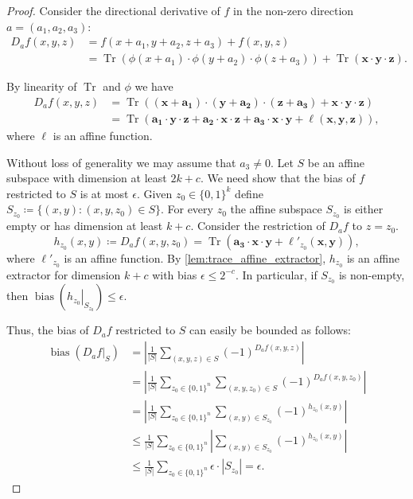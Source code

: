 \documentclass[a4paper,11pt,draft]{article}
\theoremstyle{definition}
\theoremstyle{remark}
\DeclareMathOperator{\Tr}{Tr}
\DeclareMathOperator{\bias}{bias}
\newcommand{\card}[1]{{\left|#1\right|}}
\newcommand{\iso}[1]{\mathbf{#1}}
\newcommand{\Q}{{\{0,1\}}}
\newcommand{\restr}[2]{\left.#1\right|_{#2}}
\begin{document}
\begin{proof}
  Consider the directional derivative of $f$ in the non-zero direction $a = (a_1,a_2,a_3)$:
  \begin{align*}
    D_{a} f(x, y, z) &=
    f(x+a_1, y+a_2, z+a_3) + f(x, y, z) \\ &=
    \Tr(\phi(x+a_1) \cdot \phi(y+a_2) \cdot \phi(z+a_3)) + \Tr(\iso{x} \cdot \iso{y} \cdot \iso{z}).
  \end{align*}

  By linearity of $\Tr$ and $\phi$ we have
  \begin{align*}
    D_{a} f(x, y, z) &=
    \Tr((\iso{x}+\iso{a_1}) \cdot (\iso{y} + \iso{a_2}) \cdot (\iso{z} + \iso{a_3}) + \iso{x} \cdot \iso{y} \cdot \iso{z}) \\ &=
    \Tr(\iso{a_1} \cdot \iso{y} \cdot \iso{z} + \iso{a_2} \cdot \iso{x} \cdot \iso{z} + \iso{a_3} \cdot \iso{x} \cdot \iso{y} + \ell(\iso{x},\iso{y},\iso{z})),
  \end{align*}
  where $\ell$ is an affine function.

  Without loss of generality we may assume that $a_3 \neq 0$.
  Let $S$ be an affine subspace with dimension at least $2k+c$. We need show that the bias of $f$ restricted to $S$ is at most $\epsilon$. Given $z_0 \in \Q^k$ define $S_{z_0} \coloneqq \{(x, y) : (x, y, z_0) \in S\}$. For every $z_0$ the affine subspace $S_{z_0}$ is either empty or has dimension at least $k+c$.
  Consider the restriction of $D_a f$ to $z = z_0$.
  \[
    h_{z_0}(x, y) \coloneqq D_a f(x, y, z_0) = \Tr(\iso{a_3} \cdot \iso{x} \cdot \iso{y} + \ell'_{z_0}(\iso{x}, \iso{y})),
  \]
  where $\ell'_{z_0}$ is an affine function. By \cref{lem:trace_affine_extractor}, $h_{z_0}$ is an affine extractor for dimension $k+c$ with bias $\epsilon \le 2^{-c}$. In particular, if $S_{z_0}$ is non-empty, then $\bias(\restr{h_{z_0}}{S_{z_0}}) \le \epsilon$.

  Thus, the bias of $D_a f$ restricted to $S$ can easily be bounded as follows:
  \begin{align*}
    \bias(\restr{D_a f}{S}) &=
    \left|\frac{1}{\card{S}} \sum_{(x, y, z) \in S} {(-1)}^{D_a f(x, y, z)}\right| \\ &=
    \left|\frac{1}{\card{S}} \sum_{z_0 \in \Q^n} \sum_{(x, y, z_0) \in S} {(-1)}^{D_a f(x, y, z_0)}\right| \\ &=
    \left|\frac{1}{\card{S}} \sum_{z_0 \in \Q^n} \sum_{(x, y) \in S_{z_0}} {(-1)}^{h_{z_0}(x, y)}\right| \\ &\le
    \frac{1}{\card{S}} \sum_{z_0 \in \Q^n} \left|\sum_{(x, y) \in S_{z_0}} {(-1)}^{h_{z_0}(x, y)}\right| \\ &\le
    \frac{1}{\card{S}} \sum_{z_0 \in \Q^n} \epsilon \cdot \card{S_{z_0}} = \epsilon.
  \end{align*}
\end{proof}
\end{document}
